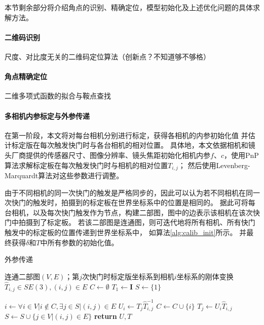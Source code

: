 \documentclass{ctexart}
\begin{document}
本节剩余部分将介绍角点的识别、精确定位，模型初始化及上述优化问题的具体求解方法。

\paragraph{二维码识别}尺度、对比度无关的二维码定位算法（创新点？不知道够不够格）

\paragraph{角点精确定位}二维多项式函数的拟合与鞍点查找

\paragraph{多相机内参标定与外参传递}
在第一阶段，本文将对每台相机分别进行标定，获得各相机的内参初始化值
并估计标定版在每次触发快门时与各台相机的相对位置。
具体地，本文依据相机和镜头厂商提供的传感器尺寸、图像分辨率、镜头焦距初始化相机内参$f$、$c$，使用PnP算法求解标定板在每次触发快门时与相机的相对位置$T_{i,j}$；
然后使用Levenberg-Marquardt算法对这些参数进行调整。

由于不同相机的同一次快门的触发是严格同步的，因此可以认为若不同相机在同一次快门的触发时，拍摄到的标定板在世界坐标系中的位置是相同的。
据此可将每台相机，以及每次快门触发作为节点，构建二部图，图中的边表示该相机在该次快门中拍摄到了标定板。
若该二部图是连通图，则可迭代地将所有相机、所有快门触发中的标定板的位置传递到世界坐标系中，
如算法\ref{alg:calib_init}所示。
并最终获得$\delta$和$T$中所有参数的初始化值。

\begin{algorithm}[t]
    \caption{外参传递}
    \label{alg:calib_init}
    \begin{algorithmic}[1]
        \Require 连通二部图$(V,E)$；第$j$次快门时标定版坐标系到相机$i$坐标系的刚体变换$\hat{T}_{i,j}\in SE(3),(i,j)\in E$
            \State $C \gets \emptyset$
            \State $T_{1} \gets \mathbf{I}$
            \State $S \gets \{1\}$

                \State $i \gets \forall i\in V| i\notin C, \exists j\in S| (i,j)\in E$
                \State $U_{i} \gets T_{j}\hat{T}_{i,j}^{-1}$
                \State $C \gets C \cup \{i\}$
                    \State $T_{j} \gets U_{i}\hat{T}_{i,j}$
                \EndFor
                \State $S \gets S \cup \{j\in V| (i,j)\in E\}$
            \EndWhile
            \State \textbf{return} $U, T$
        \EndProcedure
    \end{algorithmic}
\end{algorithm}
\end{document}

